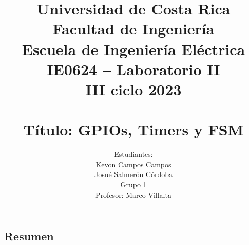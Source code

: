 \documentclass[12pt,a4paper]{article}
\author{Estudiantes:\\ Kevon Campos Campos\\ Josué Salmerón Córdoba  \\{\small Grupo 1}\\ Profesor:  Marco Villalta  \vspace*{3.0in}}
\title{Universidad de Costa Rica\\{\small Facultad de Ingeniería\\Escuela de Ingeniería Eléctrica\\IE0624 – Laboratorio II\\III ciclo 2023\\\vspace*{0.55in}}\\ Título: GPIOs, Timers y FSM  \vspace*{1.35in}}
\begin{document}
 

\maketitle  
\thispagestyle{empty}%
\renewcommand{\thepage}{\roman{page}}
\newpage
\tableofcontents
\newpage
\listoffigures 
\newpage
\listoftables  
\newpage
\renewcommand{\thepage}{\arabic{page}} 
\setcounter{page}{1}
\begin{center}
\section{Resumen}
\end{center}


   
\newpage  


%





\newpage 


 
\end{document}
